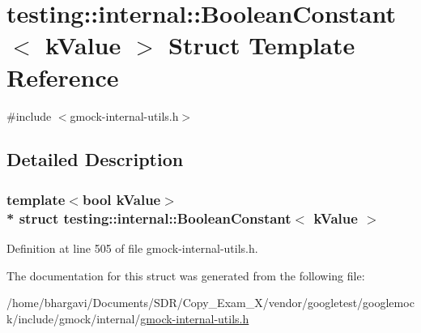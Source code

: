 \hypertarget{structtesting_1_1internal_1_1_boolean_constant}{}\section{testing\+:\+:internal\+:\+:Boolean\+Constant$<$ k\+Value $>$ Struct Template Reference}
\label{structtesting_1_1internal_1_1_boolean_constant}


{\ttfamily \#include $<$gmock-\/internal-\/utils.\+h$>$}



\subsection{Detailed Description}
\subsubsection*{template$<$bool k\+Value$>$\\*
struct testing\+::internal\+::\+Boolean\+Constant$<$ k\+Value $>$}



Definition at line 505 of file gmock-\/internal-\/utils.\+h.



The documentation for this struct was generated from the following file\+:\begin{DoxyCompactItemize}
\item 
/home/bhargavi/\+Documents/\+S\+D\+R/\+Copy\+\_\+\+Exam\+\_\+X/vendor/googletest/googlemock/include/gmock/internal/\hyperlink{gmock-internal-utils_8h}{gmock-\/internal-\/utils.\+h}\end{DoxyCompactItemize}
